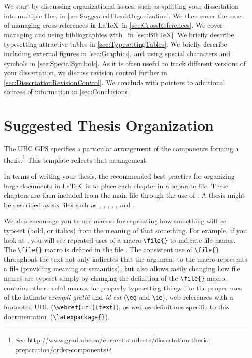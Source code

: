 We start by discussing organizational issues, such as splitting
your dissertation into multiple files, in
\autoref{sec:SuggestedThesisOrganization}.
We then cover the ease of managing cross-references in \LaTeX\ in
\autoref{sec:CrossReferences}.
We cover managing and using bibliographies with \BibTeX\ in
\autoref{sec:BibTeX}. 
We briefly describe typesetting attractive tables in
\autoref{sec:TypesettingTables}.
We briefly describe including external figures in
\autoref{sec:Graphics}, and using special characters and symbols
in \autoref{sec:SpecialSymbols}.
As it is often useful to track different versions of your dissertation,
we discuss revision control further in
\autoref{sec:DissertationRevisionControl}. 
We conclude with pointers to additional sources of information in
\autoref{sec:Conclusions}.

\section{Suggested Thesis Organization}
\label{sec:SuggestedThesisOrganization}

The \acs{UBC} \acf{GPS} specifies a particular arrangement of the
components forming a thesis.\footnote{See
    \url{http://www.grad.ubc.ca/current-students/dissertation-thesis-preparation/order-components}}
This template reflects that arrangement.

In terms of writing your thesis, the recommended best practice for
organizing large documents in \LaTeX\ is to place each chapter in
a separate file.  These chapters are then included from the main
file through the use of \verb++.  A thesis might
be described as six files such as ,
, , ,
, and .

We also encourage you to use macros for separating how something
will be typeset (\eg bold, or italics) from the meaning of that
something. 
For example, if you look at , you will see repeated
uses of a macro \verb+\file{}+ to indicate file names.
The \verb+\file{}+ macro is defined in the file .
The consistent use of \verb+\file{}+ throughout the text not only
indicates that the argument to the macro represents a file (providing
meaning or semantics), but also allows easily changing how
file names are typeset simply by changing the definition of the
\verb+\file{}+ macro.
 contains other useful macros for properly typesetting
things like the proper uses of the latinate \emph{exempli grati\={a}}
and \emph{id est} (\ie \verb+\eg+ and \verb+\ie+), 
web references with a footnoted \acs{URL} (\verb+\webref{url}{text}+),
as well as definitions specific to this documentation
(\verb+\latexpackage{}+).

